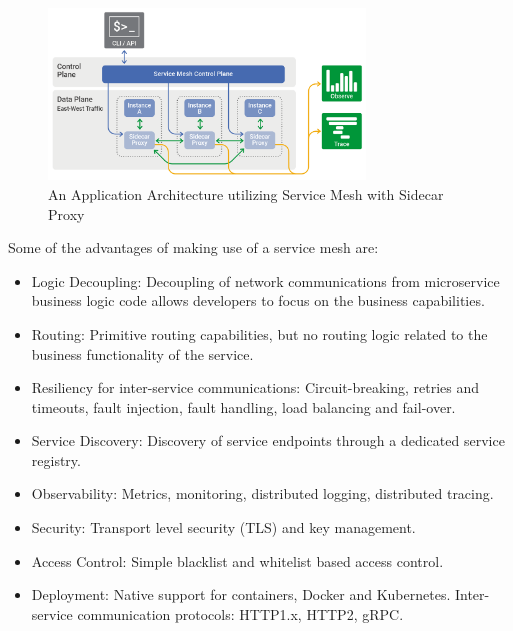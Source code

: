 \documentclass{Configuration_Files/PoliMi3i_thesis}
\begin{document}
\begin{figure}[H]
    \centering
    \includegraphics[width=0.75\textwidth]{myImages/service_mesh.png}
    \caption{An Application Architecture utilizing Service Mesh with Sidecar Proxy }
    \label{fig:service_mesh}
\end{figure}

Some of the advantages of making use of a service mesh are:

\begin{itemize}
    \item Logic Decoupling: Decoupling of network communications from microservice business logic code allows developers to focus on the business capabilities.
    
    \item Routing: Primitive routing capabilities, but no routing logic related to the business functionality of the service.
    
    \item Resiliency for inter-service communications: Circuit-breaking, retries and timeouts, fault injection, fault handling, load balancing and fail-over. 
    
    \item Service Discovery: Discovery of service endpoints through a dedicated service registry.
    
    \item Observability: Metrics, monitoring, distributed logging, distributed tracing.
    
    \item Security: Transport level security (TLS) and key management.
    
    \item Access Control: Simple blacklist and whitelist based access control.
    
    \item Deployment: Native support for containers, Docker and Kubernetes. Inter-service communication protocols: HTTP1.x, HTTP2, gRPC.
\end{itemize}
\end{document}
